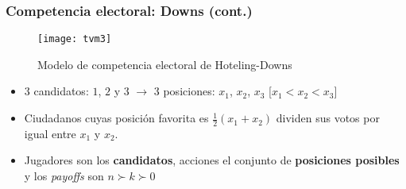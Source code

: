 \documentclass[14pt,aspectratio=169]{beamer}
\begin{document}
\begin{frame}
\frametitle{Competencia electoral: Downs (cont.)}
\begin{figure}[htbp] \vspace{-2cm}
  \centering
  \texttt{[image: tvm3]} \vspace{-3cm}
  \caption{Modelo de competencia electoral de Hoteling-Downs}
  \label{fig:3}
\end{figure}
\vspace{-0.5cm}
\begin{itemize}\itemsep 10pt
\item 3 candidatos: $1$, $2$ y $3$ $\longrightarrow$ 3 posiciones:
  $x_{1}$, $x_{2}$, $x_{3}$ [$x_{1}<x_{2}<x_{3}$]
\item Ciudadanos cuyas posición favorita es $\frac{1}{2}(x_{1}+x_{2})$
  dividen sus votos por igual entre $x_{1}$ y $x_{2}$.
\item Jugadores son los
  \textbf{candidatos}, acciones  el conjunto de
  \textbf{posiciones posibles} y los \textit{payoffs} son $n\succ k
  \succ 0$
\end{itemize}
\end{frame}
\end{document}

